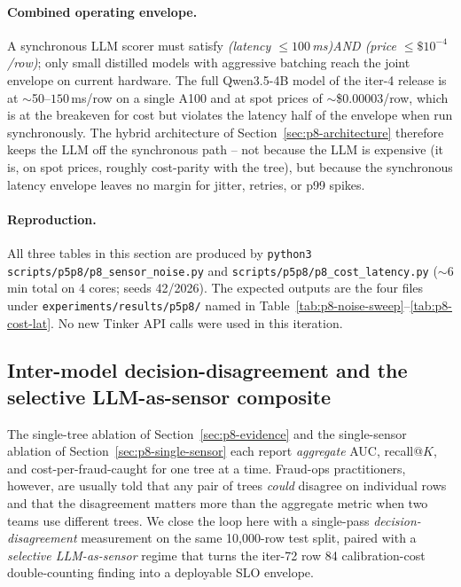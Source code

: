 \documentclass{article}
\providecommand{\tableref}[1]{Table~\ref{#1}}
\providecommand{\secref}[1]{Section~\ref{#1}}
\begin{document}
\paragraph{Combined operating envelope.}
A synchronous LLM scorer must satisfy
\emph{(latency $\le 100\,$ms)AND (price $\le \$10^{-4}$/row)}; only
small distilled models with aggressive batching reach the joint
envelope on current hardware. The full Qwen3.5-4B model of the iter-4
release is at $\sim$50--$150\,$ms/row on a single A100 and at spot
prices of $\sim$\$0.00003/row, which is at the breakeven for cost but
violates the latency half of the envelope when run synchronously. The
hybrid architecture of \secref{sec:p8-architecture} therefore keeps the
LLM off the synchronous path -- not because the LLM is expensive
(it is, on spot prices, roughly cost-parity with the tree), but because
the synchronous latency envelope leaves no margin for jitter, retries,
or p99 spikes.

\paragraph{Reproduction.} All three tables in this section are produced
by \texttt{python3 scripts/p5p8/p8\_sensor\_noise.py} and
\texttt{scripts/p5p8/p8\_cost\_latency.py} ($\sim$6 min total on
4 cores; seeds 42/2026). The expected outputs are the four files under
\texttt{experiments/results/p5p8/} named in
\tableref{tab:p8-noise-sweep}--\ref{tab:p8-cost-lat}. No new
Tinker API calls were used in this iteration. \subsection{Inter-model decision-disagreement and the selective LLM-as-sensor
composite}\label{sec:p8-decision-disagreement}

The single-tree ablation of \secref{sec:p8-evidence} and the
single-sensor ablation of \secref{sec:p8-single-sensor} each report
\emph{aggregate} AUC, recall@$K$, and cost-per-fraud-caught for one
tree at a time. Fraud-ops practitioners, however, are usually told
that any pair of trees \emph{could} disagree on individual rows and
that the disagreement matters more than the aggregate metric when
two teams use different trees. We close the loop here with a
single-pass \emph{decision-disagreement} measurement on the same
10,000-row test split, paired with a \emph{selective LLM-as-sensor}
regime that turns the iter-72 row 84 calibration-cost
double-counting finding into a deployable SLO envelope.
\end{document}
